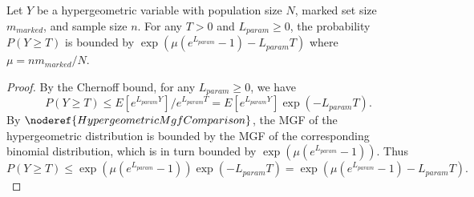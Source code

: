 \begin{helper}[FiberAndDegreeMixedLiftedIntersectionHypergeometricBound]
\label{helper:FiberAndDegreeMixedLiftedIntersectionHypergeometricBound}
Let $Y$ be a hypergeometric variable with population size $N$, marked set size $m_{marked}$, and sample size $n$.
For any $T > 0$ and $L_{param} \ge 0$, the probability $P(Y \ge T)$ is bounded by $\exp(\mu(e^{L_{param}}-1) - L_{param} T)$ where $\mu = n m_{marked} / N$.
\end{helper}

\begin{proof}
By the Chernoff bound, for any $L_{param} \ge 0$, we have
\[
P(Y \ge T) \le E[e^{L_{param} Y}] / e^{L_{param} T} = E[e^{L_{param} Y}] \exp(-L_{param} T).
\]
By $\noderef{HypergeometricMgfComparison}$, the MGF of the hypergeometric distribution is bounded by the MGF of the corresponding binomial distribution, which is in turn bounded by $\exp(\mu(e^{L_{param}}-1))$.
Thus
\[
P(Y \ge T) \le \exp(\mu(e^{L_{param}}-1)) \exp(-L_{param} T) = \exp(\mu(e^{L_{param}}-1) - L_{param} T).
\]
\end{proof}
